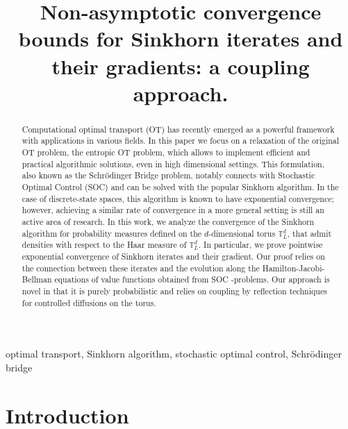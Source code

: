 \documentclass[final,12pt]{colt2023} %
\title[Exponential convergence of Sinkhorn algorithm: a coupling approach]{Non-asymptotic convergence bounds for Sinkhorn iterates and their gradients: a coupling approach.}
\def\torus{\tset}
\def\torusL{\torus_L}
\def\tset{\mathbb{T}}
\begin{document}
\maketitle

\begin{abstract}%
    Computational optimal transport (OT) has recently emerged as a powerful framework with applications in various fields. In this paper we focus on a relaxation of the original OT problem, the entropic OT problem, which allows to implement efficient and practical algorithmic solutions, even in high dimensional settings. This formulation, also known as the Schr\"odinger Bridge problem, notably connects with Stochastic Optimal Control (SOC) and can be solved with the popular Sinkhorn algorithm. In the case of discrete-state spaces, this algorithm is known to have exponential convergence; however, achieving a similar rate of convergence in a more general setting is still an active area of research. In this work, we analyze the convergence of the Sinkhorn algorithm for probability measures defined on the $d$-dimensional torus $\torusL^d$, that admit densities with respect to the Haar measure of $\torusL^d$. In particular, we prove pointwise exponential convergence of Sinkhorn iterates and their gradient. Our proof relies on the connection between these iterates and the evolution along the Hamilton-Jacobi-Bellman equations of value functions obtained from SOC -problems. Our approach is novel in that it is purely probabilistic and relies on coupling by reflection techniques for controlled diffusions on the torus.
\end{abstract}

\begin{keywords}%
optimal transport, Sinkhorn algorithm, stochastic optimal control, Schr\"odinger bridge
\end{keywords}



\def\mcx{\mathcal{X}}
\def\msa{\mathsf{A}}
\def\forany{\text{ for any }}

\section{Introduction}\label{sec:intro}
\end{document}
